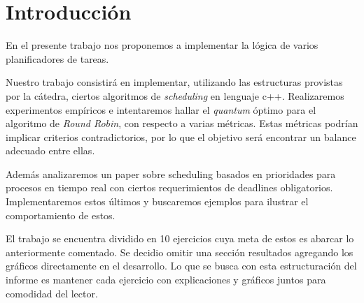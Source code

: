 \section{Introducción}

En el presente trabajo nos proponemos a implementar la lógica de varios planificadores de tareas.

Nuestro trabajo consistir\'a en implementar, utilizando las estructuras provistas por la c\'atedra, ciertos algoritmos de \textit{scheduling} en lenguaje c++. Realizaremos experimentos empíricos e intentaremos hallar el \textit{quantum} \'optimo para el algoritmo de \textit{Round Robin}, con respecto a varias m\'etricas. Estas m\'etricas podr\'ian implicar criterios contradictorios, por lo que el objetivo ser\'a encontrar un balance adecuado entre ellas.

Además analizaremos un paper sobre scheduling basados en prioridades para procesos en tiempo real con ciertos requerimientos de deadlines obligatorios. Implementaremos estos últimos y buscaremos ejemplos para ilustrar el comportamiento de estos.

El trabajo se encuentra dividido en 10 ejercicios cuya meta de estos es abarcar lo anteriormente comentado. Se decidio omitir una secci\'on resultados agregando los gráficos directamente en el desarrollo. Lo que se busca con esta estructuración del informe es mantener cada ejercicio con explicaciones y gr\'aficos juntos para comodidad del lector.

